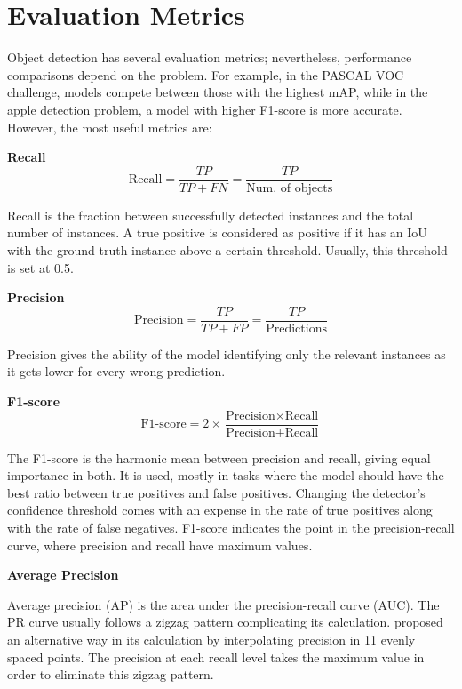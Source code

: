 \section{Evaluation Metrics}
Object detection has several evaluation metrics; nevertheless, performance comparisons depend on the problem. For example, in the PASCAL VOC challenge, models compete between those with the highest mAP, while in the apple detection problem, a model with higher F1-score is more accurate. However, the most useful metrics are:

\bigskip
\textbf{Recall}
\bigskip\noindent
\begin{equation}
  \text{Recall} = \frac{TP}{TP+FN}=\frac{TP}{\text{Num. of objects}}
\end{equation} 

Recall is the fraction between successfully detected instances and the total number of instances. A true positive is considered as positive if it has an IoU with the ground truth instance above a certain threshold. Usually, this threshold is set at 0.5.

\bigskip
\textbf{Precision}
\bigskip\noindent
\begin{equation}
  \text{Precision} = \frac{TP}{TP+FP}=\frac{TP}{\text{Predictions}}
\end{equation} 

Precision gives the ability of the model identifying only the relevant instances as it gets lower for every wrong prediction.

\bigskip
\textbf{F1-score}
\bigskip\noindent
\begin{equation}
  \text{F1-score} = 2\times\frac{\text{Precision}\times \text{Recall}}{\text{Precision}+\text{Recall}}\end{equation} 
  
The F1-score is the harmonic mean between precision and recall, giving equal importance in both. It is used, mostly in tasks where the model should have the best ratio between true positives and false positives. Changing the detector's confidence threshold comes with an expense in the rate of true positives along with the rate of false negatives. F1-score indicates the point in the precision-recall curve, where precision and recall have maximum values.

\bigskip
\textbf{Average Precision}
\bigskip\noindent

Average precision (AP) is the area under the precision-recall curve (AUC). The PR curve usually follows a zigzag pattern complicating its calculation. \cite{everingham2010pascal} proposed an alternative way in its calculation by interpolating precision in 11 evenly spaced points. The precision at each recall level takes the maximum value in order to eliminate this zigzag pattern.

